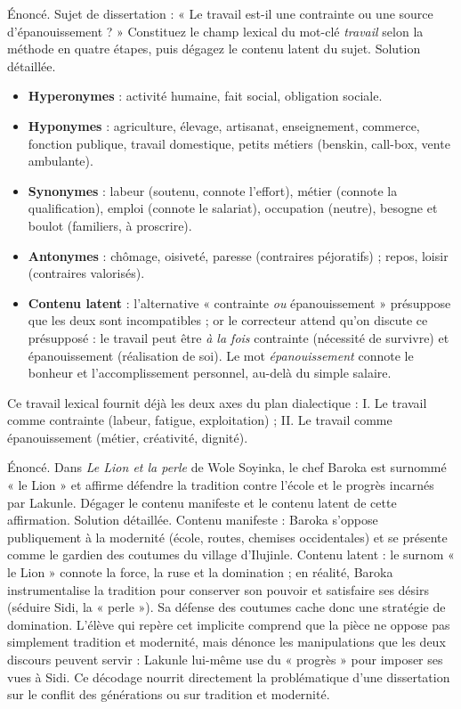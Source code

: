 \documentclass[11pt]{article}
\begin{document}
\begin{exoresolu}
Énoncé. Sujet de dissertation : « Le travail est-il une contrainte ou une source d'épanouissement ? » Constituez le champ lexical du mot-clé \emph{travail} selon la méthode en quatre étapes, puis dégagez le contenu latent du sujet.
\tcblower
Solution détaillée.
\begin{itemize}
\item \textbf{Hyperonymes} : activité humaine, fait social, obligation sociale.
\item \textbf{Hyponymes} : agriculture, élevage, artisanat, enseignement, commerce, fonction publique, travail domestique, petits métiers (benskin, call-box, vente ambulante).
\item \textbf{Synonymes} : labeur (soutenu, connote l'effort), métier (connote la qualification), emploi (connote le salariat), occupation (neutre), besogne et boulot (familiers, à proscrire).
\item \textbf{Antonymes} : chômage, oisiveté, paresse (contraires péjoratifs) ; repos, loisir (contraires valorisés).
\item \textbf{Contenu latent} : l'alternative « contrainte \emph{ou} épanouissement » présuppose que les deux sont incompatibles ; or le correcteur attend qu'on discute ce présupposé : le travail peut être \emph{à la fois} contrainte (nécessité de survivre) et épanouissement (réalisation de soi). Le mot \emph{épanouissement} connote le bonheur et l'accomplissement personnel, au-delà du simple salaire.
\end{itemize}
Ce travail lexical fournit déjà les deux axes du plan dialectique : I. Le travail comme contrainte (labeur, fatigue, exploitation) ; II. Le travail comme épanouissement (métier, créativité, dignité).
\end{exoresolu}

\begin{exoresolu}
Énoncé. Dans \emph{Le Lion et la perle} de Wole Soyinka, le chef Baroka est surnommé « le Lion » et affirme défendre la tradition contre l'école et le progrès incarnés par Lakunle. Dégager le contenu manifeste et le contenu latent de cette affirmation.
\tcblower
Solution détaillée. Contenu manifeste : Baroka s'oppose publiquement à la modernité (école, routes, chemises occidentales) et se présente comme le gardien des coutumes du village d'Ilujinle. Contenu latent : le surnom « le Lion » connote la force, la ruse et la domination ; en réalité, Baroka instrumentalise la tradition pour conserver son pouvoir et satisfaire ses désirs (séduire Sidi, la « perle »). Sa défense des coutumes cache donc une stratégie de domination. L'élève qui repère cet implicite comprend que la pièce ne oppose pas simplement tradition et modernité, mais dénonce les manipulations que les deux discours peuvent servir : Lakunle lui-même use du « progrès » pour imposer ses vues à Sidi. Ce décodage nourrit directement la problématique d'une dissertation sur le conflit des générations ou sur tradition et modernité.
\end{exoresolu}
\end{document}

